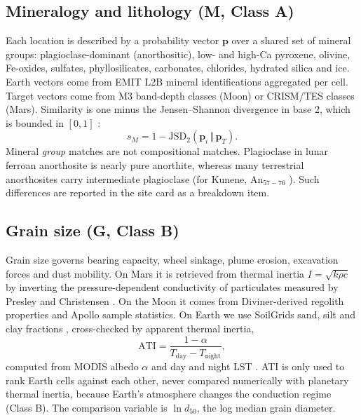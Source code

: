 \documentclass[11pt,a4paper]{article}
\begin{document}
\subsection{Mineralogy and lithology (M, Class A)}
Each location is described by a probability vector $\mathbf{p}$ over a shared set of mineral groups: plagioclase-dominant (anorthositic), low- and high-Ca pyroxene, olivine, Fe-oxides, sulfates, phyllosilicates, carbonates, chlorides, hydrated silica and ice. Earth vectors come from EMIT L2B mineral identifications \citep{emitmin} aggregated per cell. Target vectors come from M3 band-depth classes (Moon) or CRISM/TES classes (Mars). Similarity is one minus the Jensen--Shannon divergence in base 2, which is bounded in $[0,1]$ \citep{lin1991}:
\begin{equation*}
s_M = 1-\mathrm{JSD}_2(\mathbf{p}_i\,\Vert\,\mathbf{p}_T). \tag{3}
\end{equation*}
Mineral \emph{group} matches are not compositional matches. Plagioclase in lunar ferroan anorthosite is nearly pure anorthite, whereas many terrestrial anorthosites carry intermediate plagioclase (for Kunene, An$_{57-76}$ \citep{ashwal1994}). Such differences are reported in the site card as a breakdown item.

\subsection{Grain size (G, Class B)}
Grain size governs bearing capacity, wheel sinkage, plume erosion, excavation forces and dust mobility. On Mars it is retrieved from thermal inertia $I=\sqrt{k\rho c}$ by inverting the pressure-dependent conductivity of particulates measured by Presley and Christensen \citep{presley1997}. On the Moon it comes from Diviner-derived regolith properties \citep{hayne2017} and Apollo sample statistics. On Earth we use SoilGrids sand, silt and clay fractions \citep{poggio2021}, cross-checked by apparent thermal inertia,
\begin{equation*}
\mathrm{ATI}=\frac{1-\alpha}{T_{\mathrm{day}}-T_{\mathrm{night}}}, \tag{4}
\end{equation*}
computed from MODIS albedo $\alpha$ and day and night LST \citep{price1977}. ATI is only used to rank Earth cells against each other, never compared numerically with planetary thermal inertia, because Earth's atmosphere changes the conduction regime (Class B). The comparison variable is $\ln d_{50}$, the log median grain diameter.
\end{document}

